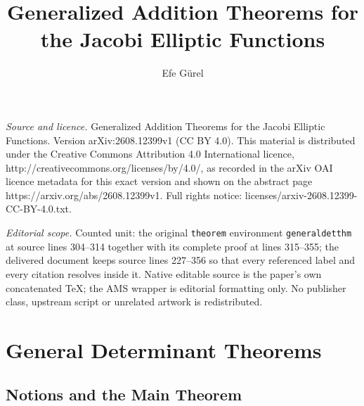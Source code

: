 \documentclass[10pt,a4paper]{amsart}
\begin{document}
\title[Generalized Addition Theorems for the Jacobi Elliptic Functi]{Generalized Addition Theorems for the Jacobi Elliptic Functions}
\author{Efe Gürel}
\date{}
\maketitle
\noindent\emph{Source and licence.} Generalized Addition Theorems for the Jacobi Elliptic Functions. Version arXiv:2608.12399v1 (CC BY 4.0). This material is distributed under the Creative Commons Attribution 4.0 International licence, http://creativecommons.org/licenses/by/4.0/, as recorded in the arXiv OAI licence metadata for this exact version and shown on the abstract page https://arxiv.org/abs/2608.12399v1. Full rights notice: licenses/arxiv-2608.12399-CC-BY-4.0.txt.\par\smallskip
\noindent\textit{Editorial scope.} Counted unit: the original \texttt{theorem} environment \texttt{generaldetthm} at source lines 304--314 together with its complete proof at lines 315--355; the delivered document keeps source lines 227--356 so that every referenced label and every citation resolves inside it. Native editable source is the paper's own concatenated TeX; the AMS wrapper is editorial formatting only. No publisher class, upstream script or unrelated artwork is redistributed.
\section{General Determinant Theorems}
\subsection{Notions and the Main Theorem}
\end{document}
